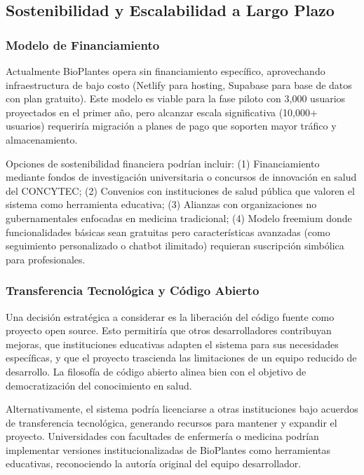 \documentclass[12pt,a4paper]{article}
\begin{document}
\subsection{Sostenibilidad y Escalabilidad a Largo Plazo}

\subsubsection{Modelo de Financiamiento}

Actualmente BioPlantes opera sin financiamiento específico, aprovechando infraestructura de bajo costo (Netlify para hosting, Supabase para base de datos con plan gratuito). Este modelo es viable para la fase piloto con 3,000 usuarios proyectados en el primer año, pero alcanzar escala significativa (10,000+ usuarios) requeriría migración a planes de pago que soporten mayor tráfico y almacenamiento.

Opciones de sostenibilidad financiera podrían incluir: (1) Financiamiento mediante fondos de investigación universitaria o concursos de innovación en salud del CONCYTEC; (2) Convenios con instituciones de salud pública que valoren el sistema como herramienta educativa; (3) Alianzas con organizaciones no gubernamentales enfocadas en medicina tradicional; (4) Modelo freemium donde funcionalidades básicas sean gratuitas pero características avanzadas (como seguimiento personalizado o chatbot ilimitado) requieran suscripción simbólica para profesionales.

\subsubsection{Transferencia Tecnológica y Código Abierto}

Una decisión estratégica a considerar es la liberación del código fuente como proyecto open source. Esto permitiría que otros desarrolladores contribuyan mejoras, que instituciones educativas adapten el sistema para sus necesidades específicas, y que el proyecto trascienda las limitaciones de un equipo reducido de desarrollo. La filosofía de código abierto alinea bien con el objetivo de democratización del conocimiento en salud.

Alternativamente, el sistema podría licenciarse a otras instituciones bajo acuerdos de transferencia tecnológica, generando recursos para mantener y expandir el proyecto. Universidades con facultades de enfermería o medicina podrían implementar versiones institucionalizadas de BioPlantes como herramientas educativas, reconociendo la autoría original del equipo desarrollador.
\end{document}
